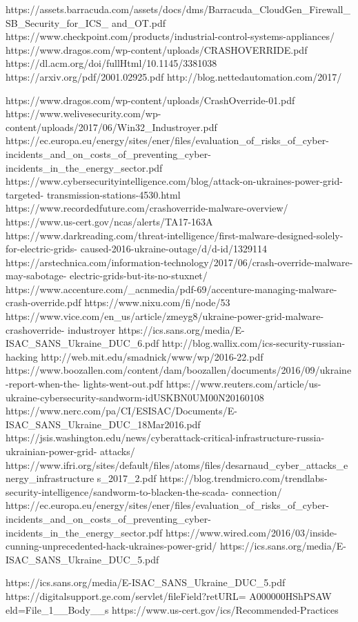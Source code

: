 https://assets.barracuda.com/assets/docs/dms/Barracuda_CloudGen_Firewall_SB_Security_for_ICS_
and_OT.pdf
https://www.checkpoint.com/products/industrial-control-systems-appliances/
https://www.dragos.com/wp-content/uploads/CRASHOVERRIDE.pdf
https://dl.acm.org/doi/fullHtml/10.1145/3381038
https://arxiv.org/pdf/2001.02925.pdf
http://blog.nettedautomation.com/2017/

https://www.dragos.com/wp-content/uploads/CrashOverride-01.pdf
https://www.welivesecurity.com/wp-content/uploads/2017/06/Win32_Industroyer.pdf
https://ec.europa.eu/energy/sites/ener/files/evaluation_of_risks_of_cyber-
incidents_and_on_costs_of_preventing_cyber-incidents_in_the_energy_sector.pdf
https://www.cybersecurityintelligence.com/blog/attack-on-ukraines-power-grid-targeted-
transmission-stations-4530.html
https://www.recordedfuture.com/crashoverride-malware-overview/
https://www.us-cert.gov/ncas/alerts/TA17-163A
https://www.darkreading.com/threat-intelligence/first-malware-designed-solely-for-electric-grids-
caused-2016-ukraine-outage/d/d-id/1329114
https://arstechnica.com/information-technology/2017/06/crash-override-malware-may-sabotage-
electric-grids-but-its-no-stuxnet/
https://www.accenture.com/_acnmedia/pdf-69/accenture-managing-malware-crash-override.pdf
https://www.nixu.com/fi/node/53
https://www.vice.com/en_us/article/zmeyg8/ukraine-power-grid-malware-crashoverride-
industroyer
https://ics.sans.org/media/E-ISAC_SANS_Ukraine_DUC_6.pdf
http://blog.wallix.com/ics-security-russian-hacking
http://web.mit.edu/smadnick/www/wp/2016-22.pdf
https://www.boozallen.com/content/dam/boozallen/documents/2016/09/ukraine-report-when-the-
lights-went-out.pdf
https://www.reuters.com/article/us-ukraine-cybersecurity-sandworm-idUSKBN0UM00N20160108
https://www.nerc.com/pa/CI/ESISAC/Documents/E-ISAC_SANS_Ukraine_DUC_18Mar2016.pdf
https://jsis.washington.edu/news/cyberattack-critical-infrastructure-russia-ukrainian-power-grid-
attacks/
https://www.ifri.org/sites/default/files/atoms/files/desarnaud_cyber_attacks_energy_infrastructure
s_2017_2.pdf
https://blog.trendmicro.com/trendlabs-security-intelligence/sandworm-to-blacken-the-scada-
connection/
https://ec.europa.eu/energy/sites/ener/files/evaluation_of_risks_of_cyber-
incidents_and_on_costs_of_preventing_cyber-incidents_in_the_energy_sector.pdf
https://www.wired.com/2016/03/inside-cunning-unprecedented-hack-ukraines-power-grid/
https://ics.sans.org/media/E-ISAC_SANS_Ukraine_DUC_5.pdf

https://ics.sans.org/media/E-ISAC_SANS_Ukraine_DUC_5.pdf
https://digitalsupport.ge.com/servlet/fileField?retURL=%
A000000HShPSAW%
eld=File_1__Body__s
https://www.us-cert.gov/ics/Recommended-Practices

